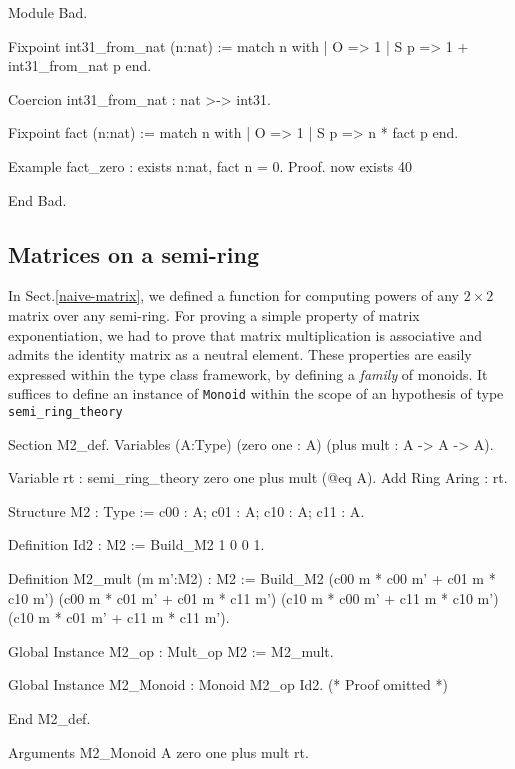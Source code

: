 \begin{Coqbad}
Module Bad.

Fixpoint int31_from_nat (n:nat) :=
  match n with
  | O => 1
  | S p => 1 + int31_from_nat p
  end.

Coercion int31_from_nat : nat >-> int31.

Fixpoint fact (n:nat) := 
  match n with
   | O => 1
   | S p => n * fact p
  end.

Example fact_zero : exists n:nat, fact n = 0.
Proof.  now exists 40%

End Bad.
\end{Coqbad}

\subsection{Matrices on a semi-ring}

In Sect.\vref{naive-matrix}, we defined a function for computing powers of any $2\times 2$ 
matrix over any semi-ring. For proving a simple property of matrix exponentiation, we had
 to prove that matrix multiplication is associative and admits the identity matrix as a neutral element. These properties are easily expressed within the type class framework, by defining a \emph{family} of monoids.
It suffices to define an instance of \texttt{Monoid} within the scope of an hypothesis
of type \texttt{semi\_ring\_theory}

\begin{Coqsrc}
Section M2_def.
Variables (A:Type)
           (zero one : A) 
           (plus mult  : A -> A -> A).

 Variable rt : semi_ring_theory  zero one plus mult  (@eq A).
 Add  Ring Aring : rt.
\end{Coqsrc}

\begin{Coqsrc}
Structure M2 : Type := {c00 : A;  c01 : A;
                        c10 : A;  c11 : A}.

Definition Id2 : M2 := Build_M2 1 0 0 1.

Definition M2_mult (m m':M2) : M2 :=
 Build_M2 
          (c00 m * c00 m' + c01 m * c10 m')
          (c00 m * c01 m' + c01 m * c11 m')
          (c10 m * c00 m' + c11 m * c10 m')
          (c10 m * c01 m' + c11 m * c11 m').

Global Instance M2_op : Mult_op M2 := M2_mult.
\end{Coqsrc}

\begin{Coqsrc}
Global Instance M2_Monoid : Monoid   M2_op Id2.
(* Proof omitted *)

End M2_def.

Arguments M2_Monoid {A zero one plus mult} rt.
\end{Coqsrc}


